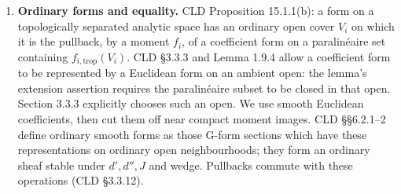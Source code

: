 \documentclass[
  11pt,
]{article}
\begin{document}
\begin{enumerate}
  In particular boundarylessness of \(X\) gives boundarylessness of
  \(X_E\). Section 3 checks minimal primes and purity, rather than
  inferring purity from equality of total dimensions. Goodness,
  strictness and separatedness are checked by affinoid presentations and
  base change of the diagonal.
\item
  \textbf{Ordinary forms and equality.} CLD Proposition 15.1.1(b): a
  form on a topologically separated analytic space has an ordinary open
  cover \(V_i\) on which it is the pullback, by a moment \(f_i\), of a
  coefficient form on a paralinéaire set containing
  \(f_{i,\mathrm{trop}}(V_i)\). CLD §3.3.3 and Lemma 1.9.4 allow a
  coefficient form to be represented by a Euclidean form on an ambient
  open: the lemma's extension assertion requires the paralinéaire subset
  to be closed in that open. Section 3.3.3 explicitly chooses such an
  open. We use smooth Euclidean coefficients, then cut them off near
  compact moment images. CLD §§6.2.1--2 define ordinary smooth forms as
  those G-form sections which have these representations on ordinary
  open neighbourhoods; they form an ordinary sheaf stable under
  \(d',d'',J\) and wedge. Pullbacks commute with these operations (CLD
  §3.3.12).


\end{enumerate}
\end{document}
